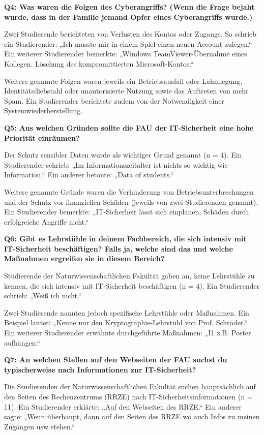 \documentclass[german,report]{i1thesis}
\begin{document}
\textbf{Q4: Was waren die Folgen des Cyberangriffs? (Wenn die Frage bejaht wurde, dass in der Familie jemand Opfer eines Cyberangriffs wurde.)}

Zwei Studierende berichteten von Verlusten des Kontos oder Zugangs. So schrieb ein Studierender: „Ich musste mir in einem Spiel einen neuen Account zulegen.“ Ein weiterer Studierender bemerkte: „Windows TeamViewer-Übernahme eines Kollegen. Löschung des kompromittierten Microsoft-Kontos.“

Weitere genannte Folgen waren jeweils ein Betriebsausfall oder Lahmlegung, Identitätsdiebstahl oder unautorisierte Nutzung sowie das Auftreten von mehr Spam. Ein Studierender berichtete zudem von der Notwendigkeit einer Systemwiederherstellung.

\textbf{Q5: Aus welchen Gründen sollte die FAU der IT-Sicherheit eine hohe Priorität einräumen?}

Der Schutz sensibler Daten wurde als wichtiger Grund genannt (n = 4). Ein Studierender schrieb: „Im Informationszeitalter ist nichts so wichtig wie Information.“ Ein anderer betonte: „Data of students.“

Weitere genannte Gründe waren die Verhinderung von Betriebsunterbrechungen und der Schutz vor finanziellen Schäden (jeweils von zwei Studierenden genannt). Ein Studierender bemerkte: „IT-Sicherheit lässt sich einplanen, Schäden durch erfolgreiche Angriffe nicht.“

\textbf{Q6: Gibt es Lehrstühle in deinem Fachbereich, die sich intensiv mit IT-Sicherheit beschäftigen? Falls ja, welche sind das und welche Maßnahmen ergreifen sie in diesem Bereich?}

Studierende der Naturwissenschaftlichen Fakultät gaben an, keine Lehrstühle zu kennen, die sich intensiv mit IT-Sicherheit beschäftigen (n = 4). Ein Studierender schrieb: „Weiß ich nicht.“

Zwei Studierende nannten jedoch spezifische Lehrstühle oder Maßnahmen. Ein Beispiel lautet: „Kenne nur den Kryptographie-Lehrstuhl von Prof. Schröder.“ Ein weiterer Studierender erwähnte durchgeführte Maßnahmen: „I1 z.B. Poster aufhängen.“

\textbf{Q7: An welchen Stellen auf den Webseiten der FAU suchst du typischerweise nach Informationen zur IT-Sicherheit?}

Die Studierenden der Naturwissenschaftlichen Fakultät suchen hauptsächlich auf den Seiten des Rechenzentrums (RRZE) nach IT-Sicherheitsinformationen (n = 11). Ein Studierender erklärte: „Auf den Webseiten des RRZE.“ Ein anderer sagte: „Wenn überhaupt, dann auf den Seiten des RRZE wo auch Infos zu meinen Zugängen usw stehen.“
\end{document}
